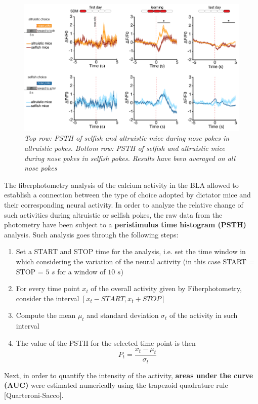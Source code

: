 \documentclass[12pt, a4paper]{report}
\begin{document}
\begin{figure}[H]
	\begin{center}
		\includegraphics[scale=0.65]{psth.png} 
	\end{center} 
	\caption{\textit{Top row: PSTH of selfish and altruistic mice during nose pokes in altruistic pokes. Bottom row:  PSTH of selfish and altruistic mice during nose pokes in selfish pokes. Results have been averaged on all nose pokes}}
	\label{psth}
\end{figure}

The fiberphotometry analysis of the calcium activity in the BLA allowed to establish a connection between the type of choice adopted by dictator mice and their corresponding neural activity. In order to analyze the relative change of such activities during altruistic or selfish pokes, the raw data from the photometry have been subject to a \textbf{peristimulus time histogram (PSTH)} analysis. Such analysis goes through the following steps:

\begin{enumerate}
	
	\item Set a START and STOP time for the analysis, i.e. set the time window in which considering the variation of the neural activity (in this case START = STOP = $5$ $s$ for a window of $10$ $s$)
	
	\item For every time point $x_t$ of the overall activity given by Fiberphotometry, consider the interval $[x_{t}-START , x_{t}+STOP]$
	
	\item Compute the mean $ \mu_t$ and standard deviation $\sigma_t$ of the activity in such interval
	
	\item The value of the PSTH for the selected time point is then
	$$ P_t = \frac{x_t - \mu_t}{\sigma_t}$$
\end{enumerate}
Next, in order to quantify the intensity of the activity, \textbf{areas under the curve (AUC)} were estimated numerically using the trapezoid quadrature rule [Quarteroni-Sacco].\\
\end{document}
